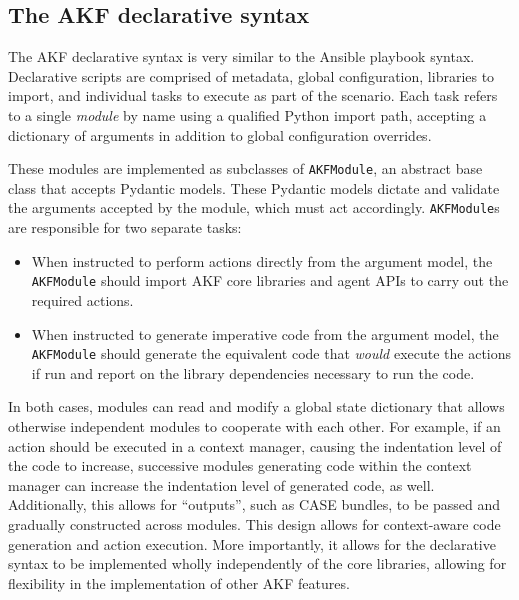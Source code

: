 \documentclass[letterpaper,12pt]{report}
\def\tightlist{}
\newcommand{\passthrough}[1]{#1}
\begin{document}
\subsection{The AKF declarative
syntax}\label{the-akf-declarative-syntax}

The AKF declarative syntax is very similar to the Ansible playbook
syntax. Declarative scripts are comprised of metadata, global
configuration, libraries to import, and individual tasks to execute as
part of the scenario. Each task refers to a single \emph{module} by name
using a qualified Python import path, accepting a dictionary of
arguments in addition to global configuration overrides.

These modules are implemented as subclasses of
\passthrough{\lstinline!AKFModule!}, an abstract base class that accepts
Pydantic models. These Pydantic models dictate and validate the
arguments accepted by the module, which must act accordingly.
\passthrough{\lstinline!AKFModule!}s are responsible for two separate
tasks:

\begin{itemize}
\tightlist
\item
  When instructed to perform actions directly from the argument model,
  the \passthrough{\lstinline!AKFModule!} should import AKF core
  libraries and agent APIs to carry out the required actions.
\item
  When instructed to generate imperative code from the argument model,
  the \passthrough{\lstinline!AKFModule!} should generate the equivalent
  code that \emph{would} execute the actions if run and report on the
  library dependencies necessary to run the code.
\end{itemize}

In both cases, modules can read and modify a global state dictionary
that allows otherwise independent modules to cooperate with each other.
For example, if an action should be executed in a context manager,
causing the indentation level of the code to increase, successive
modules generating code within the context manager can increase the
indentation level of generated code, as well. Additionally, this allows
for ``outputs'', such as CASE bundles, to be passed and gradually
constructed across modules. This design allows for context-aware code
generation and action execution. More importantly, it allows for the
declarative syntax to be implemented wholly independently of the core
libraries, allowing for flexibility in the implementation of other AKF
features.
\end{document}
